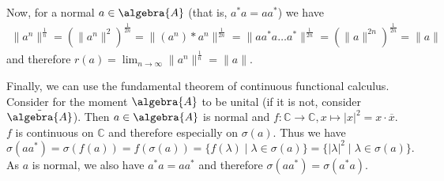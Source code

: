 \documentclass[a4paper]{article}
\begin{document}
Now, for a normal $a \in \algebra{A}$ (that is, $a^* a = a a^*$) we have
\begin{align*}
    \|a^n\|^\frac{1}{n} = \left(\|a^n\|^2\right)^\frac{1}{2n} = \|(a^n)* a^n \|^\frac{1}{2n} = \|a a^* a \dots a^*\|^\frac{1}{2n} = \left(\|a\|^{2n}\right)^\frac{1}{2n} = \|a\|
\end{align*}
and therefore $r(a) = \lim_{n \to \infty} \|a^n\|^\frac{1}{n} = \|a\|$.

Finally, we can use the fundamental theorem of continuous functional calculus. 
Consider for the moment $\algebra{A}$ to be unital (if it is not, consider $\tilde{\algebra{A}}$).
Then $a \in \algebra{A}$ is normal and $f: \mathds{C} \to \mathds{C}, x \mapsto |x|^2 = x \cdot \overline{x}$.
$f$ is continuous on $\mathds{C}$ and therefore especially on $\sigma(a)$.
Thus we have
\begin{equation*}
    \sigma(a a^*) = \sigma(f(a)) = f(\sigma(a)) = \{f(\lambda) \mid \lambda \in \sigma(a) \} = \{ |\lambda|^2 \mid \lambda \in \sigma(a) \}\text{.}
\end{equation*}
As $a$ is normal, we also have $a^* a = a a^*$ and therefore $\sigma(a a^*) = \sigma(a^* a)$.


\setcounter{subsection}{5}

\subsection{}
\end{document}
